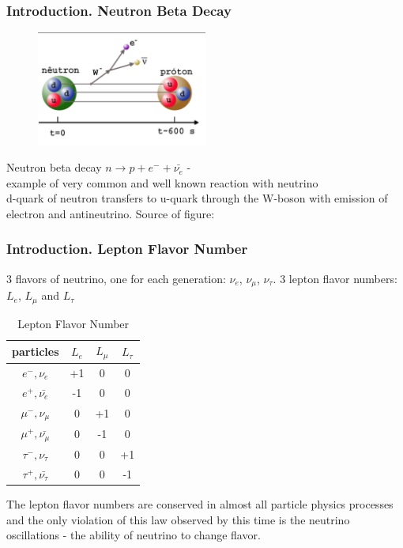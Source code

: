 \begin{frame}\frametitle{Introduction. Neutron Beta Decay}
\scriptsize
\begin{figure}
\centering
\includegraphics[width=0.50\textwidth, keepaspectratio=true]{figs/betaDecay2.png}
\end{figure}
\scriptsize Neutron beta decay $n \rightarrow p + e^- +\bar{\nu_e}$ - \\
\scriptsize example of very common and well known reaction with neutrino\\
\scriptsize d-quark of neutron transfers to u-quark through the W-boson with emission of electron and antineutrino. Source of figure: \cite{ref_fig_NeutronDecay2}
\end{frame}

\begin{frame}\frametitle{Introduction. Lepton Flavor Number}
\scriptsize
3 flavors of neutrino, one for each generation: $\nu_e$, $\nu_\mu$, $\nu_\tau$. 3 lepton flavor numbers: $L_e$, $L_{\mu}$ and $L_{\tau}$ 

\begin{table}[h]
  \begin{center}
  \caption{ Lepton Flavor Number}
  \begin{tabular}{|c|c|c|c|}
     particles & $L_e$ & $L_{\mu}$ & $L_{\tau}$ \\ \hline
     $e^-,\nu_e$ &  +1  &  0  &  0  \\ \hline 
     $e^+, \bar{\nu_e}$ &  -1  &  0  &  0  \\ \hline 
     $\mu^-,\nu_{\mu}$ &  0  &  +1  &  0  \\ \hline 
     $\mu^+, \bar{\nu_{\mu}}$ &  0  &  -1  &  0  \\ \hline 
     $\tau^-,\nu_{\tau}$ &  0  &  0  &  +1  \\ \hline 
     $\tau^+, \bar{\nu_{\tau}}$ &  0  &  0  &  -1  \\ \hline 
  \end{tabular}
  \label{tab:LeptonFlavorNumber}
  \end{center}
\end{table}
\scriptsize
The lepton flavor numbers are conserved in almost all particle physics processes and the only violation of this law observed by this time is the \large neutrino oscillations \scriptsize - the ability of neutrino to change flavor. 
\end{frame}

